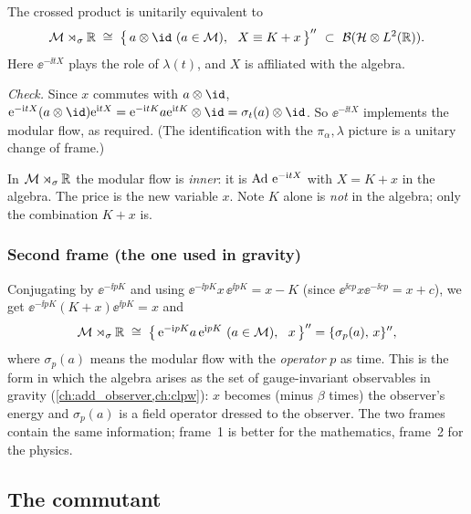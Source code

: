 \begin{proposition}
The crossed product is unitarily equivalent to
\begin{equation}
\M\rtimes_\sigma\R\;\cong\;\big\{\,a\otimes\id\ (a\in\M),\ \ X\equiv K+x\,\big\}''\ \subset\ \Bnd{\HH\otimes L^2(\R)}.
\end{equation}
Here $\ee^{-\ii tX}$ plays the role of $\lambda(t)$, and $X$ is affiliated with the algebra.
\end{proposition}
\emph{Check.} Since $x$ commutes with $a\otimes\id$, $\ee^{-\ii tX}(a\otimes\id)\ee^{\ii tX}=\ee^{-\ii tK}a\ee^{\ii tK}\otimes\id=\sigma_t(a)\otimes\id$. So $\ee^{-\ii tX}$ implements the modular flow, as required. (The identification with the $\pi_\alpha,\lambda$ picture is a unitary change of frame.)

\begin{keyidea}
In $\mathcal{M}\rtimes_\sigma\mathbb{R}$ the modular flow is \emph{inner}: it is $\operatorname{Ad}\,\mathrm{e}^{-\mathrm{i} tX}$ with $X=K+x$ in the algebra. The price is the new variable $x$. Note $K$ alone is \emph{not} in the algebra; only the combination $K+x$ is.
\end{keyidea}

\subsubsection*{Second frame (the one used in gravity)}
Conjugating by $\ee^{-\ii pK}$ and using $\ee^{-\ii pK}x\,\ee^{\ii pK}=x-K$ (since $\ee^{\ii cp}x\ee^{-\ii cp}=x+c$), we get $\ee^{-\ii pK}(K+x)\ee^{\ii pK}=x$ and
\begin{equation}
\M\rtimes_\sigma\R\;\cong\;\big\{\,\ee^{-\ii pK}a\,\ee^{\ii pK}\ (a\in\M),\ \ x\,\big\}''=\{\sigma_p(a),\,x\}'',\label{eq:frame2}
\end{equation}
where $\sigma_p(a)$ means the modular flow with the \emph{operator} $p$ as time. This is the form in which the algebra arises as the set of gauge-invariant observables in gravity (\cref{ch:add_observer,ch:clpw}): $x$ becomes (minus $\beta$ times) the observer's energy and $\sigma_p(a)$ is a field operator dressed to the observer. The two frames contain the same information; frame~1 is better for the mathematics, frame~2 for the physics.

\subsection{The commutant}


